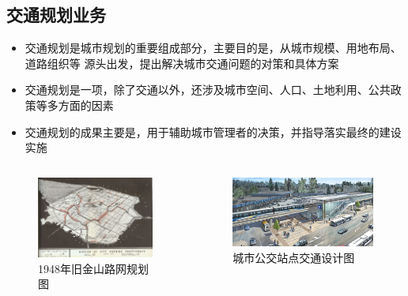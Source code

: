 \documentclass{beamerthemeMono}
\begin{document}
\subsection{交通规划业务}
\begin{frame}[t]{\subsecname}
\begin{itemize}
\item 交通规划是城市规划的重要组成部分，主要目的是，从城市规模、用地布局、道路组织等
源头出发，提出解决城市交通问题的对策和具体方案
\item 交通规划是一项，除了交通以外，还涉及城市空间、人口、土地利用、公共政策等多方面的因素
\item 交通规划的成果主要是，用于辅助城市管理者的决策，并指导落实最终的建设实施
\end{itemize}

\begin{columns}
  \begin{column}{.4\textwidth}
    \begin{figure}\flushright
      \includegraphics[height=0.3\textheight]{chp01_旧金山.jpg}
      \caption{1948年旧金山路网规划图}
    \end{figure}
  \end{column}
  \begin{column}{.6\textwidth}
    \begin{figure}\flushleft
      \includegraphics[height=0.3\textheight]{chp01_交通设计.jpg}
      \caption{城市公交站点交通设计图}
    \end{figure}
  \end{column}
\end{columns}
\end{frame}
\end{document}

